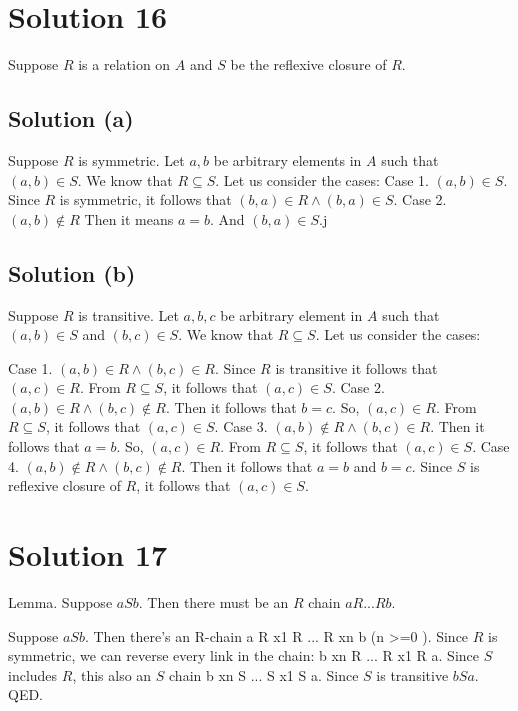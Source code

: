 \documentclass{article}
\begin{document}
\section{Solution 16}
Suppose $R$ is a relation on $A$ and $S$ be the reflexive closure of
$R$.
\subsection{Solution (a)}
Suppose $R$ is symmetric. Let $a,b$ be arbitrary elements in $A$ such
that $(a,b) \in S$. We know that $R \subseteq S$. Let us consider the
cases:
Case 1. $(a,b) \in S$. Since $R$ is symmetric, it follows that $(b,a)
\in R \land (b,a) \in S$.
Case 2. $(a,b) \notin R$ Then it means $a = b$. And $(b,a) \in S$.j

\subsection{Solution (b)}
Suppose $R$ is transitive. Let $a,b,c$ be arbitrary element in $A$
such that $(a,b) \in S$ and $(b,c) \in S$. We know that $R \subseteq
S$. Let us consider the cases:

Case 1. $(a,b) \in R \land (b,c) \in R$. Since $R$ is transitive it
follows that $(a,c) \in R$. From $R \subseteq S$, it follows that
$(a,c) \in S$.
Case 2. $(a,b) \in R \land (b,c) \notin R$. Then it follows that $b =
c$. So, $(a,c) \in R$. From $R \subseteq S$, it follows that $(a,c)
\in S$.
Case 3. $(a,b) \notin R \land (b,c) \in R$. Then it follows that $a =
b$. So, $(a,c) \in R$. From $R \subseteq S$, it follows that $(a,c)
\in S$.
Case 4. $(a,b) \notin R \land (b,c) \notin R$. Then it follows that $a
= b$ and $b = c$. Since $S$ is reflexive closure of $R$, it follows
that $(a,c) \in S$.

\section{Solution 17}

Lemma. Suppose $a S b$. Then there must be an $R$ chain $a R ... R b$.

Suppose $aSb$. Then there's an R-chain a R x1 R ... R xn b (n >=0 ).
Since $R$ is symmetric, we can reverse every link in the chain: b xn R
... R x1 R a. Since $S$ includes $R$, this also an $S$ chain b xn S
... S x1 S a. Since $S$ is transitive $b S a$. QED.
\end{document}
